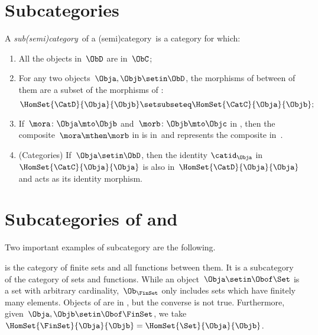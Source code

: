 
\section{Subcategories}
\label{sec:subcategories}


\begin{ctdefinition}[Subcategory]
    \label{def:subcategory}
    A \emph{sub(semi)category}~\CatD of a (semi)category~\CatC is a category for which:
    \begin{enumerate}
        \item All the objects in~$\ObD$ are in~$\ObC$;
        \item For any two objects~$\Obja,\Objb\setin \ObD$,
              the morphisms of \CatD between of them are a subset of the morphisms of \CatC:
              \begin{equation}
                  \HomSet{\CatD}{\Obja}{\Objb}\setsubseteq \HomSet{\CatC}{ \Obja}{\Objb};
              \end{equation}
        \item If~$\mora \colon \Obja \mto \Objb$ and~$\morb\colon \Objb\mto \Objc$ in \CatD, then the composite~$\mora \mthen \morb$ in \CatC is in~\CatD and represents the composite in~\CatD.
        \item (Categories) If~$\Obja\setin \ObD$, then the identity $\catid_\Obja$ in $\HomSet{\CatC}{\Obja}{\Obja}$ is also in~$\HomSet{\CatD}{\Obja}{\Obja}$ and acts as its identity morphism.
    \end{enumerate}
\end{ctdefinition}

\section{Subcategories of \Rel and \Set}

Two important examples of subcategory are the following.

\begin{example}[\FinSet]
    \label{ex:FinSet}
    \iindex{\FinSet} is the category of finite sets and all functions between them.
    It is a subcategory of the category \Set of sets and functions.
    While an object~$\Obja \setin \Obof\Set$ is a set with arbitrary cardinality,~$\Ob_{\FinSet}$ only includes sets which have finitely many elements.
    Objects of \FinSet are in \Set, but the converse is not true.
    Furthermore, given~$\Obja,\Objb\setin \Obof\FinSet$, we take~$\HomSet{\FinSet}{\Obja}{\Objb} =\HomSet{\Set}{\Obja}{\Objb}$.
\end{example}

